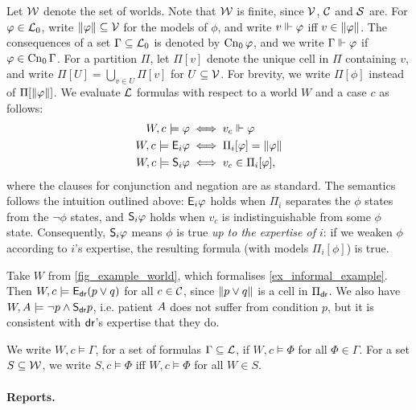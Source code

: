 Let $\worlds$ denote the set of worlds. Note that $\worlds$ is finite, since
$\vals$, $\css$ and $\srcs$ are.
%
For $\phi \in \Lprop$, write $\propmods{\phi} \subseteq \vals$ for the
models of $\phi$, and write $v \propmodels \phi$ iff $v \in \propmods{\phi}$.
The consequences of a set $\Gamma \subseteq \Lprop$ is denoted by
$\cnprop{\phi}$, and we write $\Gamma \propmodels \phi$ if $\phi \in
\cnprop{\Gamma}$.
%
For a partition $\Pi$, let $\Pi[v]$ denote the unique cell in $\Pi$ containing
$v$, and write $\Pi[U] = \bigcup_{v \in U}{\Pi[v]}$ for $U \subseteq
\vals$. For brevity, we write $\Pi[\phi]$ instead of
$\Pi[\propmods{\phi}]$. We evaluate $\L$ formulas with respect to a world $W$
and a case $c$ as follows:
\begin{align*}
    W, c \models \phi &\iff v_c \propmodels \phi \\
    W, c \models \E_i\phi &\iff \Pi_i[\phi] = \propmods{\phi} \\
    W, c \models \S_i\phi &\iff v_c \in \Pi_i[\phi],
\end{align*}
where the clauses for conjunction and negation are as standard. The semantics
follows the intuition outlined above: $\E_i\phi$ holds when $\Pi_i$ separates
the $\phi$ states from the $\neg\phi$ states, and $\S_i\phi$ holds when $v_c$
is indistinguishable from some $\phi$ state. Consequently, $\S_i\phi$ means
$\phi$ is true \emph{up to the expertise of $i$}: if we weaken $\phi$ according
to $i$'s expertise, the resulting formula (with models $\Pi_i[\phi]$) is true.

\begin{example}
    \label{ex_semantics}
    Take $W$ from \cref{fig_example_world}, which formalises
    \cref{ex_informal_example}. Then $W, c \models \E_{\dr{}}(p \lor q)$ for
    all $c \in \css$, since $\propmods{p \lor q}$ is a cell in $\Pi_{\dr{}}$.
    We also have $W, \patientA{} \models \neg{p} \land \S_{\dr{}}p$, i.e.
    patient $\patientA{}$ does not suffer from condition $p$, but it is
    consistent with $\dr{}$'s expertise that they do.
\end{example}

We write $W, c \models \Gamma$, for a set of formulas $\Gamma \subseteq \L$, if
$W, c \models \Phi$ for all $\Phi \in \Gamma$. For a set $S \subseteq \worlds$,
we write $S, c \models \Phi$ iff $W, c \models \Phi$ for all $W \in S$.

\paragraph{Reports.}

